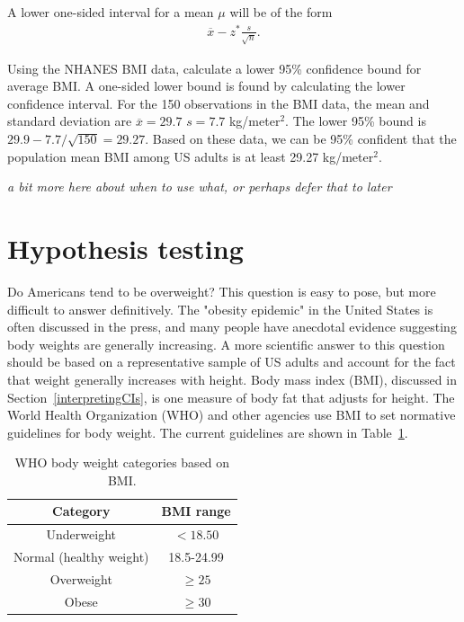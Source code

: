 \begin{spacing}{1.5}
A lower one-sided interval for a mean $\mu$ will be of the form
\begin{align*}
  \overline{x} - z^{*} \frac{s}{\sqrt{n}}.
\end{align*}

\begin{example}

Using the NHANES BMI data, calculate a lower 95\% confidence bound for average BMI.  A one-sided lower bound is found by calculating the lower confidence interval. For the 150 observations in the BMI data, the mean and standard deviation are $\overline{x} = 29.7$  $s = 7.7$ kg/meter$^2$.  The lower 95\% bound is $29.9 - 7.7/\sqrt{150} = 29.27$. Based on these data, we can be 95\% confident that the population mean BMI among US adults is at least 29.27 kg/meter$^{2}$.\end{example}

\textit{a bit more here about when to use what, or perhaps defer that to later}



\section[Hypothesis testing]{Hypothesis testing} %
\label{hypothesisTesting}


Do Americans tend to be overweight? This question is easy to pose, but more difficult to answer definitively. The "obesity epidemic" in the United States is often discussed in the press, and many people have anecdotal evidence suggesting body weights are generally increasing. A more scientific answer to this question should be based on a representative sample of US adults and account for the fact that weight generally increases with height. Body mass index (BMI), discussed in Section~\ref{interpretingCIs}, is one measure of body fat that adjusts for height. The World Health Organization (WHO) and other agencies use BMI to set normative guidelines for body weight. The current guidelines are shown in Table~\ref{whoBmiGuidelines}. 


\begin{table}[h!]
\begin{center}
\begin{tabular}{|c|c|}
\hline 
Category & BMI range\tabularnewline
\hline 
\hline 
Underweight & $<18.50$\tabularnewline
\hline 
Normal (healthy weight) & 18.5-24.99\tabularnewline
\hline 
Overweight & $\geq 25$\tabularnewline
\hline 
Obese & $\geq30$\tabularnewline
\hline
\end{tabular}
\caption{WHO body weight categories based on BMI.} 
\label{whoBmiGuidelines}
\end{center}
\end{table}


\end{spacing}
